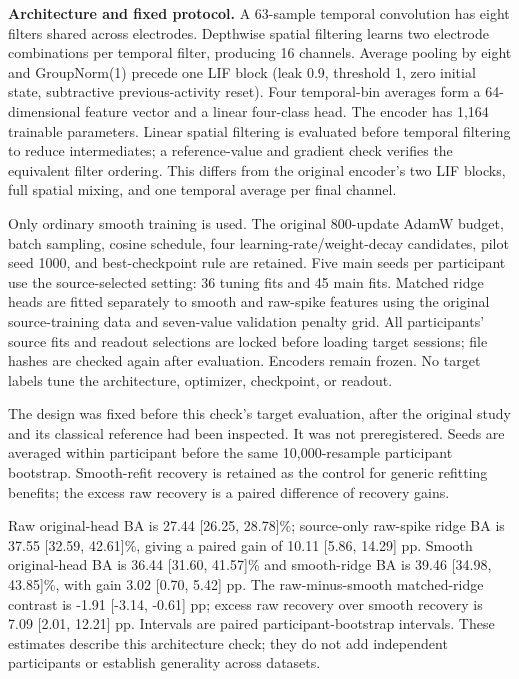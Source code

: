 \documentclass[11pt,a4paper]{article}
\begin{document}
\textbf{Architecture and fixed protocol.} A 63-sample temporal convolution has
eight filters shared across electrodes. Depthwise spatial filtering learns two
electrode combinations per temporal filter, producing 16 channels. Average pooling
by eight and GroupNorm(1) precede one LIF block (leak 0.9, threshold 1, zero initial
state, subtractive previous-activity reset). Four temporal-bin averages form a
64-dimensional feature vector and a linear four-class head. The encoder has
1,164 trainable parameters. Linear spatial filtering is evaluated before temporal
filtering to reduce intermediates; a reference-value and gradient check verifies
the equivalent filter ordering. This differs from the original encoder's two LIF
blocks, full spatial mixing, and one temporal average per final channel.

Only ordinary smooth training is used. The original 800-update AdamW budget,
batch sampling, cosine schedule, four learning-rate/weight-decay candidates,
pilot seed 1000, and best-checkpoint rule are retained. Five main seeds per
participant use the source-selected setting: 36 tuning fits and 45 main fits.
Matched ridge heads are fitted separately to smooth and raw-spike features using
the original source-training data and seven-value validation penalty grid.
All participants' source fits and readout selections are locked before loading
target sessions; file hashes are checked again after evaluation. Encoders remain
frozen. No target labels tune the architecture, optimizer, checkpoint, or readout.

The design was fixed before this check's target evaluation, after the original
study and its classical reference had been inspected. It was not preregistered.
Seeds are averaged within participant before the same 10,000-resample participant
bootstrap. Smooth-refit recovery is retained as the control for generic refitting
benefits; the excess raw recovery is a paired difference of recovery gains.

Raw original-head BA is 27.44 [26.25, 28.78]\%; source-only raw-spike ridge BA is 37.55 [32.59, 42.61]\%, giving a paired gain of 10.11 [5.86, 14.29] pp. Smooth original-head BA is 36.44 [31.60, 41.57]\% and smooth-ridge BA is 39.46 [34.98, 43.85]\%, with gain 3.02 [0.70, 5.42] pp. The raw-minus-smooth matched-ridge contrast is -1.91 [-3.14, -0.61] pp; excess raw recovery over smooth recovery is 7.09 [2.01, 12.21] pp. Intervals are paired participant-bootstrap intervals. These estimates describe this architecture check; they do not add independent participants or establish generality across datasets.
\end{document}
